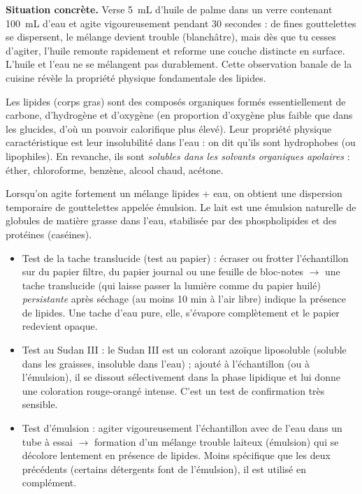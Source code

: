 \documentclass[11pt]{article}
\newcommand{\cle}[1]{{\popxbold\color{popdark}#1}}
\newcounter{popsec}
\newcounter{popsub}
\newcommand{\courssub}[1]{%
  \stepcounter{popsub}%
  \par\vspace{9pt}\noindent{\popxbold\fontsize{11.5}{13}\selectfont\color{popink}{\color{poporange}\thepopsec.\thepopsub}\hspace{6pt}#1}\par\nopagebreak\vspace{4pt}
}
\begin{document}
\courssub{Les lipides : des corps gras hydrophobes}

\textbf{Situation concrète.} Verse \SI{5}{mL} d'huile de palme dans un verre contenant \SI{100}{mL} d'eau et agite vigoureusement pendant 30 secondes : de fines gouttelettes se dispersent, le mélange devient trouble (blanchâtre), mais dès que tu cesses d'agiter, l'huile remonte rapidement et reforme une couche distincte en surface. L'huile et l'eau ne se mélangent pas durablement. Cette observation banale de la cuisine révèle la propriété physique fondamentale des lipides.

\begin{definition}[Lipides]
Les \cle{lipides} (corps gras) sont des composés organiques formés essentiellement de carbone, d'hydrogène et d'oxygène (en proportion d'oxygène plus faible que dans les glucides, d'où un pouvoir calorifique plus élevé). Leur propriété physique caractéristique est leur \cle{insolubilité dans l'eau} : on dit qu'ils sont \cle{hydrophobes} (ou lipophiles). En revanche, ils sont \emph{solubles dans les solvants organiques apolaires} : éther, chloroforme, benzène, alcool chaud, acétone.
\end{definition}

Lorsqu'on agite fortement un mélange lipides + eau, on obtient une dispersion temporaire de gouttelettes appelée \cle{émulsion}. Le lait est une émulsion naturelle de globules de matière grasse dans l'eau, stabilisée par des phospholipides et des protéines (caséines).

\begin{propriete}
\begin{itemize}
\item \cle{Test de la tache translucide (test au papier)} : écraser ou frotter l'échantillon sur du papier filtre, du papier journal ou une feuille de bloc-notes $\rightarrow$ une \cle{tache translucide} (qui laisse passer la lumière comme du papier huilé) \emph{persistante} après séchage (au moins 10 min à l'air libre) indique la présence de lipides. Une tache d'eau pure, elle, s'évapore complètement et le papier redevient opaque.
\item \cle{Test au Sudan III} : le \cle{Sudan III} est un colorant azoïque \cle{liposoluble} (soluble dans les graisses, insoluble dans l'eau) ; ajouté à l'échantillon (ou à l'émulsion), il se dissout sélectivement dans la phase lipidique et lui donne une coloration \cle{rouge-orangé} intense. C'est un test de confirmation très sensible.
\item \cle{Test d'émulsion} : agiter vigoureusement l'échantillon avec de l'eau dans un tube à essai $\rightarrow$ formation d'un mélange trouble laiteux (émulsion) qui se décolore lentement en présence de lipides. Moins spécifique que les deux précédents (certains détergents font de l'émulsion), il est utilisé en complément.
\end{itemize}
\end{propriete}
\end{document}
